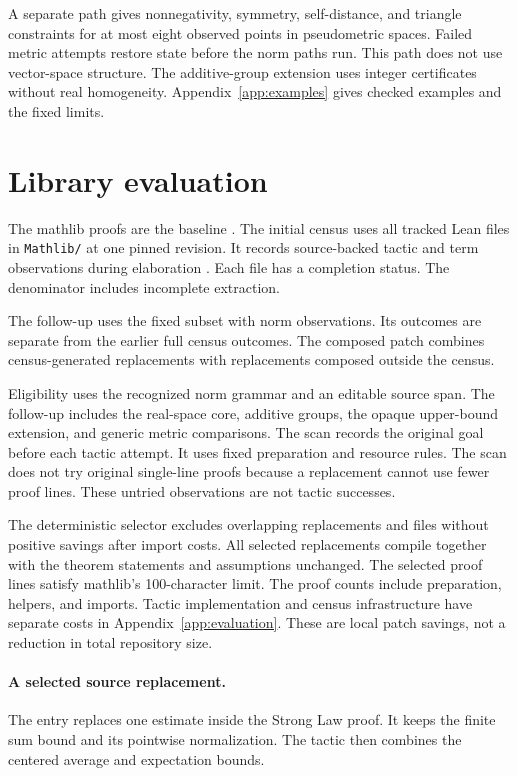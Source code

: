 \documentclass{article}
\begin{document}
A separate path gives nonnegativity, symmetry, self-distance, and triangle constraints for at most eight observed points in pseudometric spaces.
Failed metric attempts restore state before the norm paths run.
This path does not use vector-space structure.
The additive-group extension uses integer certificates without real homogeneity.
Appendix~\ref{app:examples} gives checked examples and the fixed limits.

\section{Library evaluation}
\label{sec:evaluation}
The mathlib proofs are the baseline \citep{mathlib}.
The initial census uses all tracked Lean files in \texttt{Mathlib/} at one pinned revision.
It records source-backed tactic and term observations during elaboration \citep{leaninfotree}.
Each file has a completion status.
The denominator includes incomplete extraction.

The follow-up uses the fixed subset with norm observations.
Its outcomes are separate from the earlier full census outcomes.
The composed patch combines census-generated replacements with replacements composed outside the census.



Eligibility uses the recognized norm grammar and an editable source span.
The follow-up includes the real-space core, additive groups, the opaque upper-bound extension, and generic metric comparisons.
The scan records the original goal before each tactic attempt.
It uses fixed preparation and resource rules.
The scan does not try original single-line proofs because a replacement cannot use fewer proof lines.
These untried observations are not tactic successes.

The deterministic selector excludes overlapping replacements and files without positive savings after import costs.
All selected replacements compile together with the theorem statements and assumptions unchanged.
The selected proof lines satisfy mathlib's 100-character limit.
The proof counts include preparation, helpers, and imports.
Tactic implementation and census infrastructure have separate costs in Appendix~\ref{app:evaluation}.
These are local patch savings, not a reduction in total repository size.

\paragraph{A selected source replacement.}
The entry \texttt{\CaseID} replaces one estimate inside the Strong Law proof.
It keeps the finite sum bound and its pointwise normalization.
The tactic then combines the centered average and expectation bounds.
\end{document}

